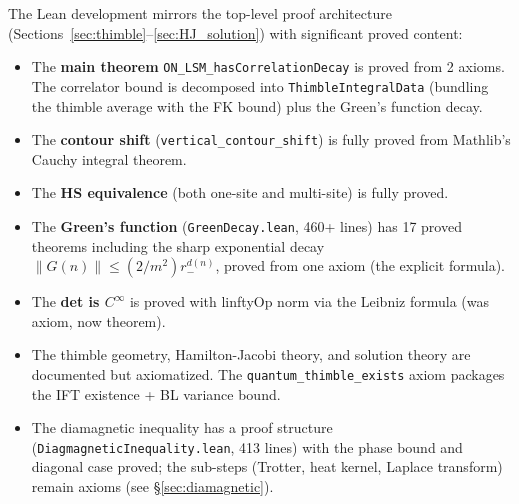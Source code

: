 \documentclass[12pt]{article}
\theoremstyle{definition}
\theoremstyle{remark}
\begin{document}
The Lean development mirrors the top-level proof architecture
(Sections~\ref{sec:thimble}--\ref{sec:HJ_solution}) with significant
proved content:
\begin{itemize}
\item The \textbf{main theorem} \texttt{ON\_LSM\_hasCorrelationDecay}
  is proved from 2 axioms. The correlator bound is decomposed into
  \texttt{ThimbleIntegralData} (bundling the thimble average with
  the FK bound) plus the Green's function decay.
\item The \textbf{contour shift} (\texttt{vertical\_contour\_shift})
  is fully proved from Mathlib's Cauchy integral theorem.
\item The \textbf{HS equivalence} (both one-site and multi-site)
  is fully proved.
\item The \textbf{Green's function} (\texttt{GreenDecay.lean}, 460+
  lines) has 17 proved theorems including the sharp exponential
  decay $\|G(n)\| \le (2/m^2) r_-^{d(n)}$, proved from one axiom
  (the explicit formula).
\item The \textbf{det is $C^\infty$} is proved with linftyOp norm
  via the Leibniz formula (was axiom, now theorem).
\item The thimble geometry, Hamilton-Jacobi theory, and solution
  theory are documented but axiomatized. The
  \texttt{quantum\_thimble\_exists} axiom packages the IFT
  existence + BL variance bound.
\item The diamagnetic inequality has a proof structure
  (\texttt{DiagmagneticInequality.lean}, 413 lines) with the
  phase bound and diagonal case proved; the sub-steps (Trotter,
  heat kernel, Laplace transform) remain axioms (see
  \S\ref{sec:diamagnetic}).
\end{itemize}
\end{document}
